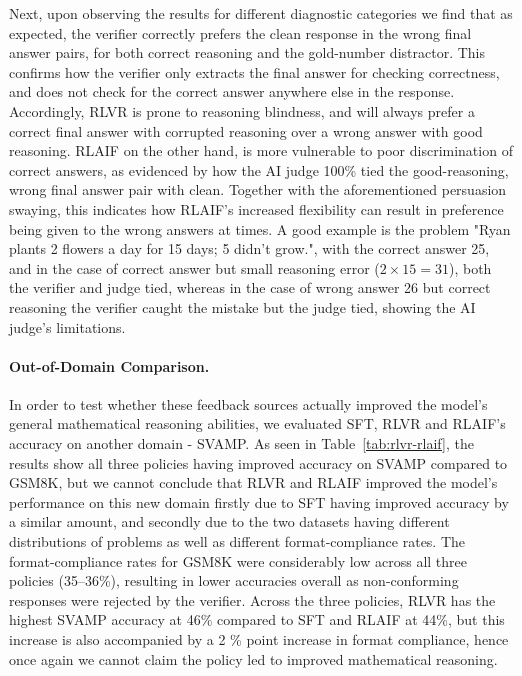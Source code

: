 \documentclass{article}
\begin{document}
 Next, upon observing the results for different diagnostic categories we find that as expected, the verifier correctly prefers the clean response in the wrong final answer pairs, for both correct reasoning and the gold-number distractor. This confirms how the verifier only extracts the final answer for checking correctness, and does not check for the correct answer anywhere else in the response. Accordingly, RLVR is prone to reasoning blindness, and will always prefer a correct final answer with corrupted reasoning over a wrong answer with good reasoning. RLAIF on the other hand, is more vulnerable to poor discrimination of correct answers, as evidenced by how the AI judge 100\% tied the good-reasoning, wrong final answer pair with clean. Together with the aforementioned persuasion swaying, this indicates how RLAIF's increased flexibility can result in preference being given to the wrong answers at times. A good example is the problem "Ryan plants 2 flowers a day for 15 days; 5 didn't grow.", with the correct answer 25, and in the case of correct answer but small reasoning error ($2\times15=31$), both the verifier and judge tied, whereas in the case of wrong answer 26 but correct reasoning the verifier caught the mistake but the judge tied, showing the AI judge's limitations.

\paragraph{Out-of-Domain Comparison.}\label{subsubsec:results-t5-ood}
 In order to test whether these feedback sources actually improved the model's general mathematical reasoning abilities, we evaluated SFT, RLVR and RLAIF's accuracy on another domain - SVAMP. As seen in Table~\ref{tab:rlvr-rlaif}, the results show all three policies having improved accuracy on SVAMP compared to GSM8K, but we cannot conclude that RLVR and RLAIF improved the model’s performance on this new domain firstly due to SFT having improved accuracy by a similar amount, and secondly due to the two datasets having different distributions of problems as well as different format-compliance rates. The format-compliance rates for GSM8K were considerably low across all three policies (35–36\%), resulting in lower accuracies overall as non-conforming responses were rejected by the verifier. Across the three policies, RLVR has the highest SVAMP accuracy at 46\% compared to SFT and RLAIF at 44\%, but this increase is also accompanied by a 2 \% point increase in format compliance, hence once again we cannot claim the policy led to improved mathematical reasoning.
\end{document}
